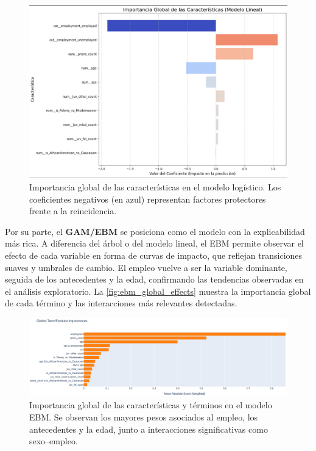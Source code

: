 \begin{figure}[h]
  \centering
  \includegraphics[width=0.85\linewidth]{figures/logistic_coefficients.png}
  \caption{Importancia global de las características en el modelo logístico. 
  Los coeficientes negativos (en azul) representan factores protectores frente a la reincidencia.}
  \label{fig:logistic_coefficients}
\end{figure}

Por su parte, el \textbf{GAM/EBM} se posiciona como el modelo con la explicabilidad más rica. 
A diferencia del árbol o del modelo lineal, el EBM permite observar el efecto de cada variable en forma de curvas de impacto, que reflejan transiciones suaves y umbrales de cambio. 
El empleo vuelve a ser la variable dominante, seguida de los antecedentes y la edad, confirmando las tendencias observadas en el análisis exploratorio. 
La \autoref{fig:ebm_global_effects} muestra la importancia global de cada término y las interacciones más relevantes detectadas.

\begin{figure}[h]
  \centering
  \includegraphics[width=\linewidth]{figures/ebm_global_effects.png}
  \caption{Importancia global de las características y términos en el modelo EBM. 
  Se observan los mayores pesos asociados al empleo, los antecedentes y la edad, junto a interacciones significativas como sexo–empleo.}
  \label{fig:ebm_global_effects}
\end{figure}


